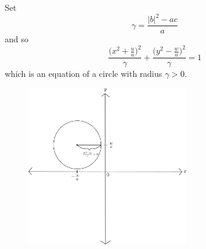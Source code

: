 \documentclass[a4paper]{article}
\begin{document}
\begin{enumerate}
\begin{solution}
\[            \]
            Set 
            \[  \gamma = \frac{ | b |^{2} - ac  }{ a  }  \]
            and so
            \[  \frac{ \Big(  x^{2} + \frac{ u }{ a }  \Big)^{2} }{ \gamma  } + \frac{ \Big( y^{2} - \frac{ w }{ a }  \Big)^{2} }{ \gamma  }  = 1 \]
            which is an equation of a circle with radius \( \gamma > 0 \).
                \begin{figure}[H]
                    \centering
                    \includegraphics[width=7cm]{figures/problem7part2.png}
                    \label{fig:my_label}
                \end{figure}


\end{solution}
\end{enumerate}
\end{document}
